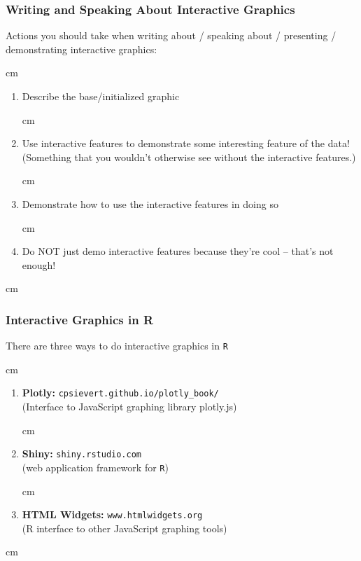 \documentclass{beamer} %
\begin{document}
\begin{frame}\frametitle{Writing and Speaking About Interactive Graphics}
	\small
	
	Actions you should take when writing about / speaking about / presenting / demonstrating interactive graphics:
	
	 cm
	
	\begin{enumerate}
		\item Describe the base/initialized graphic
		
		 cm
		
		\item Use interactive features to demonstrate some interesting feature of the data!  (Something that you wouldn't otherwise see without the interactive features.)
		
		 cm
		
		\item Demonstrate how to use the interactive features in doing so
		
		 cm
		
		\item Do NOT just demo interactive features because they're cool -- that's not enough! 
	\end{enumerate}
	
	
	 cm
	
\end{frame}




\begin{frame}\frametitle{Interactive Graphics in R}
	\small
	
	There are three ways to do interactive graphics in \texttt{R}
	
	 cm
	
	\begin{enumerate}
		\item \textbf{Plotly:}  \texttt{cpsievert.github.io/plotly\_book/} \\
		(Interface to JavaScript graphing library plotly.js)
		
		 cm
		
		\item \textbf{Shiny:}  \texttt{shiny.rstudio.com} \\
		(web application framework for \texttt{R})
		
		 cm
		
		\item \textbf{HTML Widgets:}  \texttt{www.htmlwidgets.org} \\
		(R interface to other JavaScript graphing tools)
		
	\end{enumerate}
	
	
	 cm
	
\end{frame}
\end{document}
